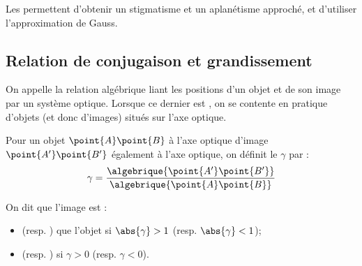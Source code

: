 \begin{propriete}
Les  permettent d'obtenir un stigmatisme et un aplanétisme approché, et d'utiliser l'approximation de Gauss.
\end{propriete}



\subsection{Relation de conjugaison et grandissement}

\begin{definition}
On appelle  la relation algébrique liant les positions d'un objet et de son image par un système optique. Lorsque ce dernier est , on se contente en pratique d'objets (et donc d'images) situés sur l'axe optique.
\end{definition}

\begin{definition}
Pour un objet $\point{A}\point{B}$  à l'axe optique d'image $\point{A'}\point{B'}$ également  à l'axe optique, on définit le  $\gamma$ par :
\[\gamma = \frac{\algebrique{\point{A'}\point{B'}}}{\algebrique{\point{A}\point{B}}}\]
\end{definition}

\begin{vocabulaire}
On dit que l'image est :
\begin{itemize}
\item {} (resp. ) que l'objet si $\abs{\gamma} > 1$ (resp. $\abs{\gamma} < 1$);
\item {} (resp. ) si $\gamma > 0$ (resp. $\gamma < 0$).
\end{itemize}
\end{vocabulaire}
